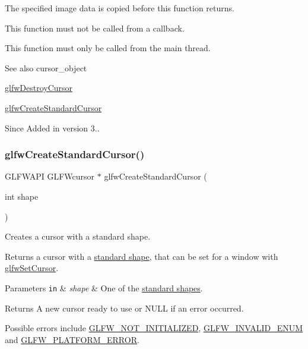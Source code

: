The specified image data is copied before this function returns.

This function must not be called from a callback.

This function must only be called from the main thread.

\begin{DoxySeeAlso}{See also}
cursor\+\_\+object 

\hyperlink{group__input_ga27556b7122117bc1bbb4bb3cc003ea43}{glfw\+Destroy\+Cursor} 

\hyperlink{group__input_gab7c5b6023b39a0021b1fcdabd1d15f09}{glfw\+Create\+Standard\+Cursor}
\end{DoxySeeAlso}
\begin{DoxySince}{Since}
Added in version 3.. 
\end{DoxySince}
\mbox{\label{group__input_gab7c5b6023b39a0021b1fcdabd1d15f09}} 
\subsubsection{\texorpdfstring{glfw\+Create\+Standard\+Cursor()}{glfwCreateStandardCursor()}}
{\footnotesize\ttfamily G\+L\+F\+W\+A\+PI G\+L\+F\+Wcursor $\ast$ glfw\+Create\+Standard\+Cursor (\begin{DoxyParamCaption}\item[{int}]{shape }\end{DoxyParamCaption})}



Creates a cursor with a standard shape. 

Returns a cursor with a \hyperlink{group__shapes}{standard shape}, that can be set for a window with \hyperlink{group__input_gafaf103cea2f43530cff7de4e01126a4f}{glfw\+Set\+Cursor}.


\begin{DoxyParams}[1]{Parameters}
\mbox{\tt in}  & {\em shape} & One of the \hyperlink{group__shapes}{standard shapes}. \\
\hline
\end{DoxyParams}
\begin{DoxyReturn}{Returns}
A new cursor ready to use or {\ttfamily N\+U\+LL} if an error occurred.
\end{DoxyReturn}
Possible errors include \hyperlink{group__errors_ga2374ee02c177f12e1fa76ff3ed15e14a}{G\+L\+F\+W\+\_\+\+N\+O\+T\+\_\+\+I\+N\+I\+T\+I\+A\+L\+I\+Z\+ED}, \hyperlink{group__errors_ga76f6bb9c4eea73db675f096b404593ce}{G\+L\+F\+W\+\_\+\+I\+N\+V\+A\+L\+I\+D\+\_\+\+E\+N\+UM} and \hyperlink{group__errors_gad44162d78100ea5e87cdd38426b8c7a1}{G\+L\+F\+W\+\_\+\+P\+L\+A\+T\+F\+O\+R\+M\+\_\+\+E\+R\+R\+OR}.

